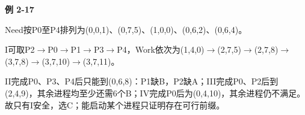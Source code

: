 {\color{ink}\bfseries 例 2-17}\par\vspace{1bp}Need按P0至P4排列为(0,\allowbreak{}0,\allowbreak{}1)、(0,\allowbreak{}7,\allowbreak{}5)、(1,\allowbreak{}0,\allowbreak{}0)、(0,\allowbreak{}6,\allowbreak{}2)、(0,\allowbreak{}6,\allowbreak{}4)。\par I可取P2\(\to \)P0\(\to \)P1\(\to \)P3\(\to \)P4，Work依次为(1,\allowbreak{}4,\allowbreak{}0)\(\to \)(2,\allowbreak{}7,\allowbreak{}5)\(\to \)(2,\allowbreak{}7,\allowbreak{}8)\(\to \)(3,\allowbreak{}7,\allowbreak{}8)\(\to \)(3,\allowbreak{}7,\allowbreak{}10)\(\to \)(3,\allowbreak{}7,\allowbreak{}11)。\par II完成P0、P3、P4后只能到(0,\allowbreak{}6,\allowbreak{}8)：P1缺B，P2缺A；III完成P0、P2后到(2,\allowbreak{}4,\allowbreak{}9)，其余进程均至少还需6个B；IV完成P0后为(0,\allowbreak{}4,\allowbreak{}10)，其余进程仍不满足。故只有I安全，选C；能启动某个进程只证明存在可行前缀。
